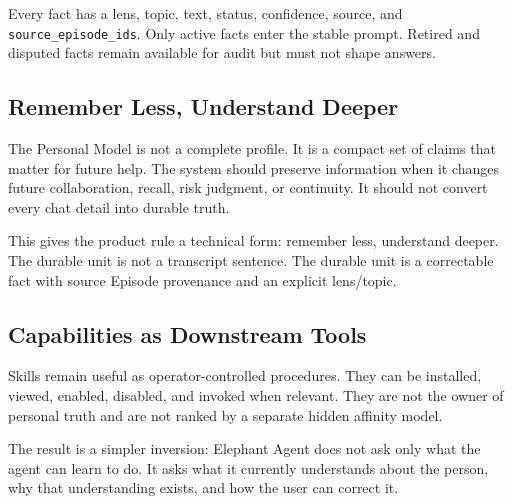 Every fact has a lens, topic, text, status, confidence, source, and
\texttt{source\_episode\_ids}. Only active facts enter the stable prompt.
Retired and disputed facts remain available for audit but must not shape
answers.

\subsection{Remember Less, Understand Deeper}

The Personal Model is not a complete profile. It is a compact set of claims that
matter for future help. The system should preserve information when it changes
future collaboration, recall, risk judgment, or continuity. It should not
convert every chat detail into durable truth.

This gives the product rule a technical form: remember less, understand deeper.
The durable unit is not a transcript sentence. The durable unit is a correctable
fact with source Episode provenance and an explicit lens/topic.

\subsection{Capabilities as Downstream Tools}

Skills remain useful as operator-controlled procedures. They can be installed,
viewed, enabled, disabled, and invoked when relevant. They are not the owner of
personal truth and are not ranked by a separate hidden affinity model.

The result is a simpler inversion: Elephant Agent does not ask only what the agent can
learn to do. It asks what it currently understands about the person, why that
understanding exists, and how the user can correct it.
